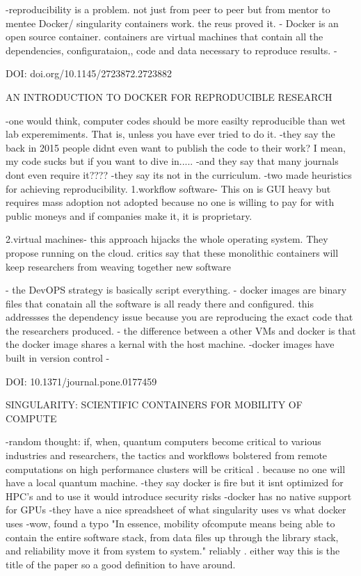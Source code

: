     -reproducibility is a problem. not just from peer to peer but from mentor to mentee
    Docker/ singularity containers work. the reus proved it. 
    - Docker is an open source container. containers are virtual machines that contain all the
    dependencies, configurataion,, code and data necessary to reproduce results. 
    -
    
DOI: doi.org/10.1145/2723872.2723882

    AN INTRODUCTION TO DOCKER FOR REPRODUCIBLE RESEARCH

    -one would think, computer codes should be more easilty reproducible than
    wet lab experemiments. That is, unless you have ever tried to do it. 
    -they say the back in 2015 people didnt even want to publish the code to their work?
    I mean, my code sucks but if you want to dive in.....
    -and they say that many journals dont even require it????
    -they say its not in the curriculum. 
    -two made heuristics for achieving reproducibility. 
        1.workflow software- This on is GUI heavy but requires mass adoption
        not adopted because no one is willing to pay for with public moneys
        and if companies make it, it is proprietary. 

        2.virtual machines- this approach hijacks the whole operating system. They propose
        running on the cloud. critics say that these monolithic containers will keep researchers
        from weaving together new software

    - the DevOPS strategy is basically script everything. 
    - docker images are binary files that conatain all the software is all ready there and
    configured. this addressses the dependency issue because you are reproducing the 
    exact code that the researchers produced.
    - the difference between a other VMs and docker is that the docker image shares a kernal 
    with the host machine. 
    -docker images have built in version control
    -

DOI: 10.1371/journal.pone.0177459

    SINGULARITY: SCIENTIFIC CONTAINERS FOR MOBILITY OF COMPUTE

        
    -random thought: if, when, quantum computers become critical to various industries and
    researchers, the tactics and workflows bolstered from remote computations on high performance 
    clusters will be critical . because no one will have a local quantum machine.
    -they say docker is fire but it isnt optimized for HPC's and to use it would introduce security
    risks
    -docker has no native support for GPUs
    -they have a nice spreadsheet of what singularity uses vs what docker uses
    -wow, found a typo "In essence, mobility ofcompute means being able to contain the entire software stack, from data files up through the library stack, and reliability move it from system to system." reliably . either way
    this is the title of the paper so a good definition to have around. 

